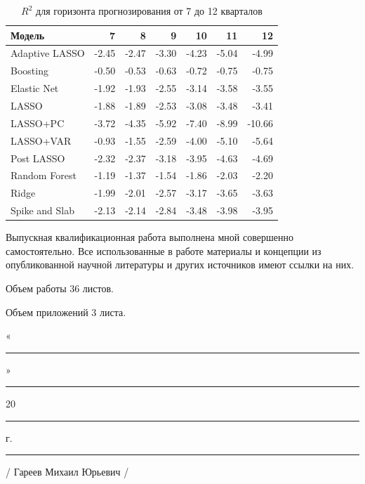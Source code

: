\begin{table}[ht]
\centering
\caption{$R^2$ для горизонта прогнозирования от 7 до 12 кварталов}
\begin{tabular}{lrrrrrr}
  \hline
Модель & 7 & 8 & 9 & 10 & 11 & 12 \\ 
  \hline
Adaptive LASSO & -2.45 & -2.47 & -3.30 & -4.23 & -5.04 & -4.99 \\ 
  Boosting & -0.50 & -0.53 & -0.63 & -0.72 & -0.75 & -0.75 \\ 
  Elastic Net & -1.92 & -1.93 & -2.55 & -3.14 & -3.58 & -3.55 \\ 
  LASSO & -1.88 & -1.89 & -2.53 & -3.08 & -3.48 & -3.41 \\ 
  LASSO+PC & -3.72 & -4.35 & -5.92 & -7.40 & -8.99 & -10.66 \\ 
  LASSO+VAR & -0.93 & -1.55 & -2.59 & -4.00 & -5.10 & -5.64 \\ 
  Post LASSO & -2.32 & -2.37 & -3.18 & -3.95 & -4.63 & -4.69 \\ 
  Random Forest & -1.19 & -1.37 & -1.54 & -1.86 & -2.03 & -2.20 \\ 
  Ridge & -1.99 & -2.01 & -2.57 & -3.17 & -3.65 & -3.63 \\ 
  Spike and Slab & -2.13 & -2.14 & -2.84 & -3.48 & -3.98 & -3.95 \\ 
   \hline
\end{tabular}
\end{table}


\newpage

\newpage


\thispagestyle{empty} 

Выпускная квалификационная работа выполнена мной совершенно самостоятельно. Все использованные в работе материалы и концепции из опубликованной научной литературы и других источников имеют ссылки на них.

\vspace{2ex}

Объем работы 36 листов.

\vspace{2ex}

Объем приложений 3 листа.

\vspace{4ex}

\noindent « \rule{1em}{0.5pt} » \rule{5em}{0.5pt} 20 \rule{1.4em}{0.5pt} г. 

\vspace{4ex}

\noindent \rule{11em}{0.25pt} \hspace{8em} / Гареев Михаил Юрьевич /


